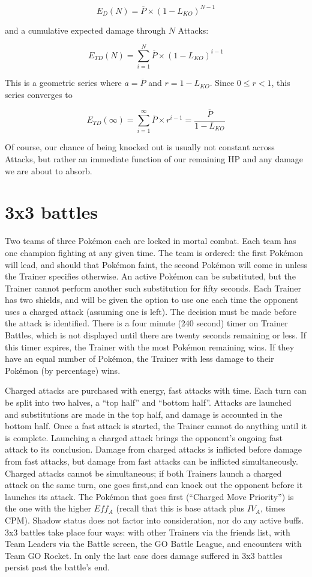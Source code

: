\[ E_D(N) = \overline{P} \times (1 - L_{KO})^{N-1} \]

and a cumulative expected damage through $N$ Attacks:

\[ E_{TD}(N) = \sum^N_{i=1} \overline{P} \times (1 - L_{KO})^{i-1} \]

This is a geometric series where $a = \overline{P}$ and $r = 1 - L_{KO}$.
Since $0 \leq r < 1$, this series converges to

\[ E_{TD}(\infty) = \sum^\infty_{i=1} \overline{P} \times r^{i-1} = \frac{\overline{P}}{1 - L_{KO}} \]

Of course, our chance of being knocked out is usually not constant across
 Attacks, but rather an immediate function of our remaining HP and any
 damage we are about to absorb.

\section{3x3 battles}
\label{sec:3x3}
Two teams of three Pokémon each are locked in mortal combat.
Each team has one champion fighting at any given time.
The team is ordered: the first Pokémon will lead, and should that Pokémon
  faint, the second Pokémon will come in unless the Trainer specifies otherwise.
An active Pokémon can be substituted, but the Trainer cannot perform another
  such substitution for fifty seconds.
Each Trainer has two shields, and will be given the option to use one each time
  the opponent uses a charged attack (assuming one is left).
The decision must be made before the attack is identified.
There is a four minute (240 second) timer on Trainer Battles, which is not displayed
  until there are twenty seconds remaining or less.
If this timer expires, the Trainer with the most Pokémon remaining wins.
If they have an equal number of Pokémon, the Trainer with less damage to their
  Pokémon (by percentage) wins.

Charged attacks are purchased with energy, fast attacks with time.
Each turn can be split into two halves, a ``top half'' and ``bottom half''.
Attacks are launched and substitutions are made in the top half, and damage is accounted in the bottom half.
Once a fast attack is started, the Trainer cannot do anything until it is complete.
Launching a charged attack brings the opponent's ongoing fast attack to its conclusion.
Damage from charged attacks is inflicted before damage from fast attacks,
  but damage from fast attacks can be inflicted simultaneously.
Charged attacks cannot be simultaneous; if both Trainers launch a charged attack
  on the same turn, one goes first,and can knock out the opponent before it
  launches its attack.
The Pokémon that goes first (``Charged Move Priority'') is the one with the
  higher $Eff_A$ (recall that this is base attack plus $IV_A$, times CPM).
Shadow status does not factor into consideration, nor do any active buffs.
3x3 battles take place four ways: with other Trainers via the friends list,
 with Team Leaders via the Battle screen, the GO Battle League,
 and encounters with Team GO Rocket.
In only the last case does damage suffered in 3x3 battles persist past the battle's end.

